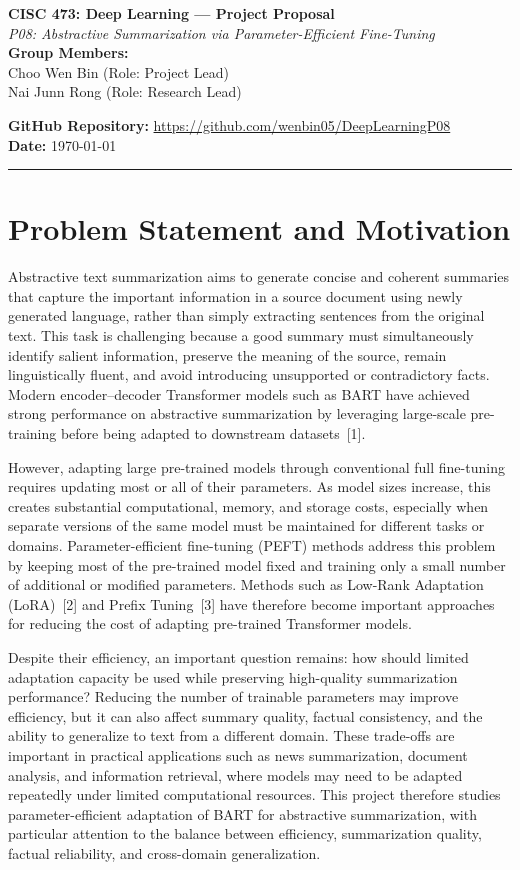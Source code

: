 \documentclass[11pt, letterpaper]{article}
\begin{document}
{\centering
  {\Large\textbf{CISC 473: Deep Learning --- Project Proposal}}\\[0.5em]
  {\large\textit{P08: Abstractive Summarization via Parameter-Efficient Fine-Tuning}}\\[0.4em]
  \textbf{Group Members:}\\{}
  Choo Wen Bin  \quad (Role: Project Lead)\\{}
  Nai Junn Rong  \quad (Role: Research Lead)\\{}

  \textbf{GitHub Repository:} \url{https://github.com/wenbin05/DeepLearningP08}\\[0.3em]
  \textbf{Date:} \today\\[0.4em]
  \rule{\linewidth}{0.4pt}
}

\section{Problem Statement and Motivation}


Abstractive text summarization aims to generate concise and coherent summaries
that capture the important information in a source document using newly
generated language, rather than simply extracting sentences from the original
text. This task is challenging because a good summary must simultaneously
identify salient information, preserve the meaning of the source, remain
linguistically fluent, and avoid introducing unsupported or contradictory
facts. Modern encoder--decoder Transformer models such as BART have achieved
strong performance on abstractive summarization by leveraging large-scale
pre-training before being adapted to downstream datasets~[1].

However, adapting large pre-trained models through conventional full
fine-tuning requires updating most or all of their parameters. As model sizes
increase, this creates substantial computational, memory, and storage costs,
especially when separate versions of the same model must be maintained for
different tasks or domains. Parameter-efficient fine-tuning (PEFT) methods
address this problem by keeping most of the pre-trained model fixed and
training only a small number of additional or modified parameters. Methods such
as Low-Rank Adaptation (LoRA)~[2] and Prefix Tuning~[3] have therefore become
important approaches for reducing the cost of adapting pre-trained Transformer models.

Despite their efficiency, an important question remains: how should limited
adaptation capacity be used while preserving high-quality summarization performance?
Reducing the number of trainable parameters may improve efficiency, but it can
also affect summary quality, factual consistency, and the ability to generalize
to text from a different domain. These trade-offs are important in practical
applications such as news summarization, document analysis, and information
retrieval, where models may need to be adapted repeatedly under limited
computational resources. This project therefore studies parameter-efficient
adaptation of BART for abstractive summarization, with particular attention to
the balance between efficiency, summarization quality, factual reliability,
and cross-domain generalization.
\end{document}
